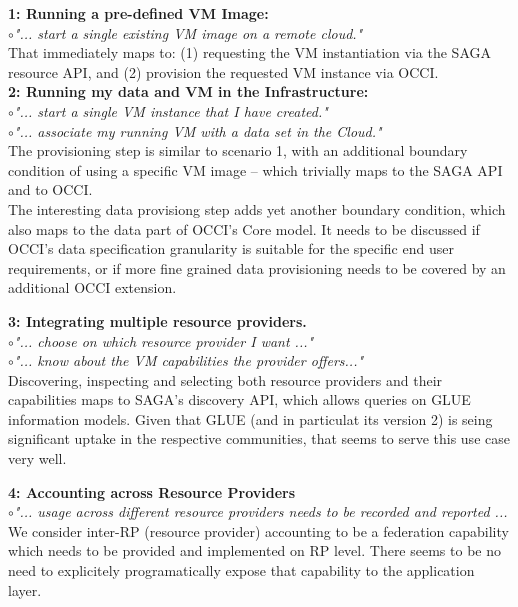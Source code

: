 \documentclass[10pt,conference,final,letterpaper,twoside,twocolumn,]{IEEEtran}
\newcommand{\I}[1]{\textit{#1}}
\newcommand{\B}[1]{\textbf{#1}}
\newcommand{\bull}{$\circ$}
\begin{document}
  \noindent
  \B{1: Running a pre-defined VM Image:}\\
  \bull \I{"... start a single existing VM image on a remote cloud."}\\
  That immediately maps to: (1) requesting the VM instantiation via
  the SAGA resource API, and (2) provision the requested VM instance
  via OCCI.\\

  \noindent
  \B{2: Running my data and VM in the Infrastructure:}\\
  \bull \I{"... start a single VM instance that I have created."}\\
  \bull \I{"... associate my running VM with a data set in the Cloud."}\\
  The provisioning step is similar to scenario 1, with an additional
  boundary condition of using a specific VM image -- which trivially
  maps to the SAGA API and to OCCI.\\
  The interesting data provisiong step adds yet another boundary
  condition, which also maps to the data part of OCCI's Core model.
  It needs to be discussed if OCCI's data specification granularity
  is suitable for the specific end user requirements, or if more fine
  grained data provisioning needs to be covered by an additional OCCI
  extension.

  \noindent
  \B{3: Integrating multiple resource providers.}\\
  \bull \I{"... choose on which resource provider I want ..."}\\
  \bull \I{"... know about the VM capabilities the provider offers..."}\\
  Discovering, inspecting and selecting both resource providers and
  their capabilities maps to SAGA's discovery API, which allows
  queries on GLUE information models.  Given that GLUE (and in
  particulat its version 2) is seing significant uptake in the
  respective communities, that seems to serve this use case very well.  

  \noindent
  \B{4: Accounting across Resource Providers}\\
  \bull \I{"... usage across different resource providers needs to be
  recorded and reported ... }\\
  We consider inter-RP (resource provider) accounting to be a federation 
  capability which needs to be provided and implemented on RP level.
  There seems to be no need to explicitely programatically expose that 
  capability to the application layer.
\end{document}
